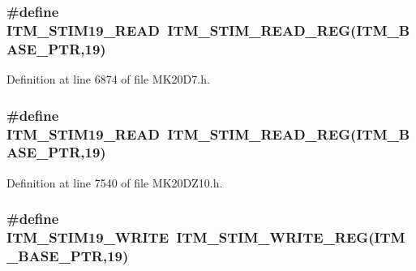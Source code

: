 \subsubsection[{\texorpdfstring{I\+T\+M\+\_\+\+S\+T\+I\+M19\+\_\+\+R\+E\+AD}{ITM_STIM19_READ}}]{\setlength{\rightskip}{0pt plus 5cm}\#define I\+T\+M\+\_\+\+S\+T\+I\+M19\+\_\+\+R\+E\+AD~{\bf I\+T\+M\+\_\+\+S\+T\+I\+M\+\_\+\+R\+E\+A\+D\+\_\+\+R\+EG}({\bf I\+T\+M\+\_\+\+B\+A\+S\+E\+\_\+\+P\+TR},19)}\hypertarget{group___i_t_m___register___accessor___macros_gaae6a230f21e1fb36ab999e662677ac65}{}\label{group___i_t_m___register___accessor___macros_gaae6a230f21e1fb36ab999e662677ac65}


Definition at line 6874 of file M\+K20\+D7.\+h.

\subsubsection[{\texorpdfstring{I\+T\+M\+\_\+\+S\+T\+I\+M19\+\_\+\+R\+E\+AD}{ITM_STIM19_READ}}]{\setlength{\rightskip}{0pt plus 5cm}\#define I\+T\+M\+\_\+\+S\+T\+I\+M19\+\_\+\+R\+E\+AD~{\bf I\+T\+M\+\_\+\+S\+T\+I\+M\+\_\+\+R\+E\+A\+D\+\_\+\+R\+EG}({\bf I\+T\+M\+\_\+\+B\+A\+S\+E\+\_\+\+P\+TR},19)}\hypertarget{group___i_t_m___register___accessor___macros_gaae6a230f21e1fb36ab999e662677ac65}{}\label{group___i_t_m___register___accessor___macros_gaae6a230f21e1fb36ab999e662677ac65}


Definition at line 7540 of file M\+K20\+D\+Z10.\+h.

\subsubsection[{\texorpdfstring{I\+T\+M\+\_\+\+S\+T\+I\+M19\+\_\+\+W\+R\+I\+TE}{ITM_STIM19_WRITE}}]{\setlength{\rightskip}{0pt plus 5cm}\#define I\+T\+M\+\_\+\+S\+T\+I\+M19\+\_\+\+W\+R\+I\+TE~{\bf I\+T\+M\+\_\+\+S\+T\+I\+M\+\_\+\+W\+R\+I\+T\+E\+\_\+\+R\+EG}({\bf I\+T\+M\+\_\+\+B\+A\+S\+E\+\_\+\+P\+TR},19)}\hypertarget{group___i_t_m___register___accessor___macros_ga0dcaa81a5a092538e5d2184087988886}{}\label{group___i_t_m___register___accessor___macros_ga0dcaa81a5a092538e5d2184087988886}


